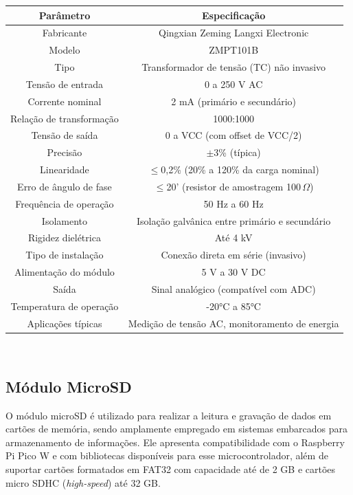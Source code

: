 \begin{quadro}[h]
\centering
\caption{Especificações técnicas do sensor de tensão ZMPT101B}
\begin{tabular}{|c|c|}
\hline
\textbf{Parâmetro} & \textbf{Especificação} \\
\hline
Fabricante & Qingxian Zeming Langxi Electronic \\
\hline
Modelo & ZMPT101B \\
\hline
Tipo & Transformador de tensão (TC) não invasivo \\
\hline
Tensão de entrada & 0 a 250 V AC \\
\hline
Corrente nominal & 2 mA (primário e secundário) \\
\hline
Relação de transformação & 1000:1000 \\
\hline
Tensão de saída & 0 a VCC (com offset de VCC/2) \\
\hline
Precisão & $\pm$3\% (típica) \\
\hline
Linearidade & $\leq$0,2\% (20\% a 120\% da carga nominal) \\
\hline
Erro de ângulo de fase & $\leq$20' (resistor de amostragem 100\,$\Omega$) \\
\hline
Frequência de operação & 50 Hz a 60 Hz \\
\hline
Isolamento & Isolação galvânica entre primário e secundário \\
\hline
Rigidez dielétrica & Até 4 kV \\
\hline
Tipo de instalação & Conexão direta em série (invasivo) \\
\hline
Alimentação do módulo & 5 V a 30 V DC \\
\hline
Saída & Sinal analógico (compatível com ADC) \\
\hline
Temperatura de operação & -20°C a 85°C \\
\hline
Aplicações típicas & Medição de tensão AC, monitoramento de energia \\
\hline
\end{tabular}\\
\label{quad:zmpt101b}
\end{quadro}

\subsection{Módulo MicroSD}
O módulo microSD é utilizado para realizar a leitura e gravação de dados em cartões de memória, sendo amplamente empregado em sistemas embarcados para armazenamento de informações. Ele apresenta compatibilidade com o Raspberry Pi Pico W e com bibliotecas disponíveis para esse microcontrolador, além de suportar cartões formatados em FAT32 com capacidade até de 2 GB e cartões micro SDHC (\textit{high-speed}) até 32 GB.

